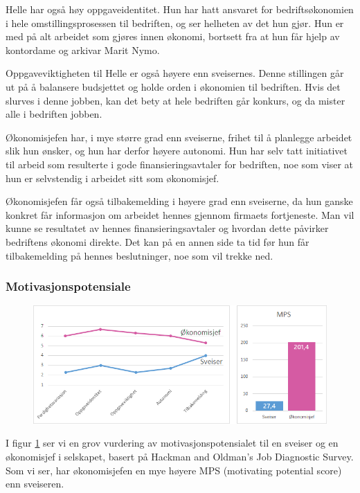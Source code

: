 Helle har også høy oppgaveidentitet. Hun har hatt ansvaret for bedriftsøkonomien i hele omstillingsprosessen til bedriften, og ser helheten av det hun gjør. Hun er med på alt arbeidet som gjøres innen økonomi, bortsett fra at hun får hjelp av kontordame og arkivar Marit Nymo.

Oppgaveviktigheten til Helle er også høyere enn sveisernes. Denne stillingen går ut på å balansere budsjettet og holde orden i økonomien til bedriften. Hvis det slurves i denne jobben, kan det bety at hele bedriften går konkurs, og da mister alle i bedriften jobben.

Økonomisjefen har, i mye større grad enn sveiserne, frihet til å planlegge arbeidet slik hun ønsker, og hun har derfor høyere autonomi. Hun har selv tatt initiativet til arbeid som resulterte i gode finansieringsavtaler for bedriften, noe som viser at hun er selvstendig i arbeidet sitt som økonomisjef.

Økonomisjefen får også tilbakemelding i høyere grad enn sveiserne, da hun ganske konkret får informasjon om arbeidet hennes gjennom firmaets fortjeneste. Man vil kunne se resultatet av hennes finansieringsavtaler og hvordan dette påvirker bedriftens økonomi direkte. Det kan på en annen side ta tid før hun får tilbakemelding på hennes beslutninger, noe som vil trekke ned.

\subsubsection{Motivasjonspotensiale}
\begin{figure}[ht!]
    \centering
    \includegraphics[width=135mm]{mps.png}
    \label{fig:mps}
\end{figure}
I figur \ref{fig:mps} ser vi en grov vurdering av motivasjonspotensialet til en sveiser og en økonomisjef i selskapet, basert på Hackman and Oldman’s Job Diagnostic Survey. Som vi ser, har økonomisjefen en mye høyere MPS (motivating potential score) enn sveiseren.


